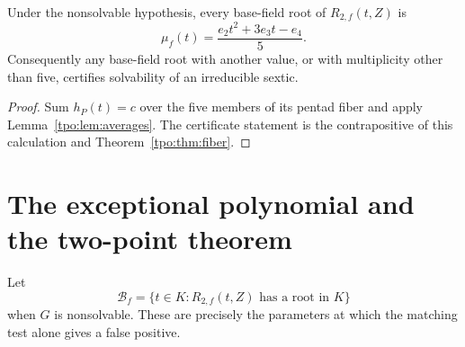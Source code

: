 \documentclass[11pt,letterpaper]{article}
\numberwithin{equation}{section}
\theoremstyle{definition}
\theoremstyle{remark}
\newcommand{\Rtwo}{R_{2,f}}
\begin{document}
\begin{corollary}
\label{tpo:cor:mu}
Under the nonsolvable hypothesis, every base-field root of $\Rtwo(t,Z)$ is
\begin{equation}
 \mu_f(t)=\frac{e_2t^2+3e_3t-e_4}{5}.
 \label{tpo:eq:mu}
\end{equation}
Consequently any base-field root with another value, or with multiplicity
other than five, certifies solvability of an irreducible sextic.
\end{corollary}
\begin{proof}
Sum $h_P(t)=c$ over the five members of its pentad fiber and apply
Lemma~\ref{tpo:lem:averages}. The certificate statement is the contrapositive of
this calculation and Theorem~\ref{tpo:thm:fiber}.
\end{proof}

\section{The exceptional polynomial and the two-point theorem}
\label{tpo:sec:exceptional}

Let
\[
 \mathcal B_f=\{t\in K:\Rtwo(t,Z)\text{ has a root in }K\}
\]
when $G$ is nonsolvable. These are precisely the parameters at which the
matching test alone gives a false positive.
\end{document}
